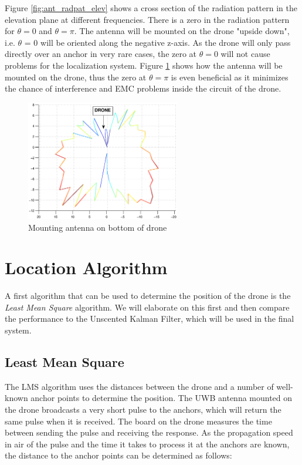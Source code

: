 \documentclass[a4paper]{article}        %
\begin{document}
			Figure \ref{fig:ant_radpat_elev} shows a cross section of the radiation pattern in the elevation plane at different frequencies. There is a zero in the radiation pattern for $\theta=0$ and $\theta=\pi$. The antenna will be mounted on the drone "upside down", i.e. $\theta$ = 0 will be oriented along the negative z-axis. As the drone will only pass directly over an anchor in very rare cases, the zero at $\theta=0$ will not cause problems for the localization system. Figure \ref{fig:mount_antenna} shows how the antenna will be mounted on the drone, thus the zero at $\theta=\pi$ is even beneficial as it minimizes the chance of interference and EMC problems inside the circuit of the drone. 

		\begin{figure}[H]
			\centering
			\includegraphics[width=0.6\textwidth]{images/antenna/mount_antenna.eps}
			\caption{Mounting antenna on bottom of drone}
			\label{fig:mount_antenna}
		\end{figure}

\section{Location Algorithm}
	A first algorithm that can be used to determine the position of the drone is the \textit{Least Mean Square} algorithm. We will elaborate on this first and then compare the performance to the Unscented Kalman Filter, which will be used in the final system. 

	\subsection{Least Mean Square}
	\label{subsec:LMS}

		The LMS algorithm uses the distances between the drone and a number of well-known anchor points to determine the position. The UWB antenna mounted on the drone broadcasts a very short pulse to the anchors, which will return the same pulse when it is received. The board on the drone measures the time between sending the pulse and receiving the response. As the propagation speed in air of the pulse and the time it takes to process it at the anchors are known, the distance to the anchor points can be determined as follows:
\end{document}

